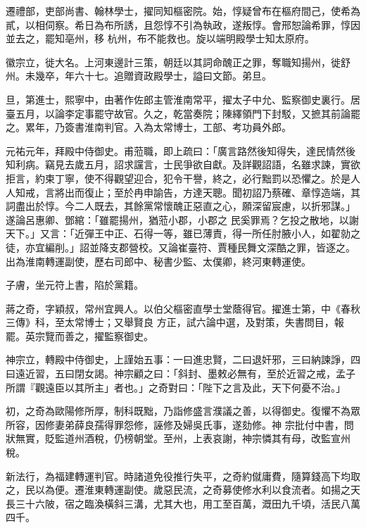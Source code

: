 \begin{pinyinscope}
 遷禮部，吏部尚書、翰林學士，擢同知樞密院。始，惇疑曾布在樞府間己，使希為貳，以相伺察。希日為布所誘，且怨惇不引為執政，遂叛惇。會邢恕論希罪，惇因並去之，罷知亳州，移
 杭州，布不能救也。旋以端明殿學士知太原府。



 徽宗立，徙大名。上河東邊計三策，朝廷以其詞命醜正之罪，奪職知揚州，徙舒州。未幾卒，年六十七。追贈資政殿學士，謚曰文節。弟旦。



 旦，第進士，熙寧中，由著作佐郎主管淮南常平，擢太子中允、監察御史裏行。居臺五月，以論李定事罷守故官。久之，乾當奏院；陳繹領門下封駁，又摭其前論罷之。累年，乃簽書淮南判官。入為太常博士，工部、考功員外郎。



 元祐元年，拜殿中侍御史。甫蒞職，即上疏曰：「廣言路然後知得失，達民情然後知利病。竊見去歲五月，詔求讜言，士民爭欲自獻。及詳觀詔語，名雖求諫，實欲拒言，約束丁寧，使不得觀望迎合，犯令干譽，終之，必行黜罰以恐懼之。於是人人知戒，言將出而復止；至於冉申諭告，方達天聰。聞初詔乃蔡確、章惇造端，其詞盡出於惇。今二人既去，其餘黨常懷醜正惡直之心，願深留宸慮，以折邪謀。」遂論呂惠卿、鄧綰：「雖罷揚州，猶蒞小郡，小郡之
 民奚罪焉？乞投之散地，以謝天下。」又言：「近彈王中正、石得一等，雖已薄責，得一所任肘腋小人，如翟勍之徒，亦宜編削。」詔並降支郡營校。又論崔臺符、賈種民舞文深酷之罪，皆逐之。出為淮南轉運副使，歷右司郎中、秘書少監、太僕卿，終河東轉運使。



 子膚，坐元符上書，陷於黨籍。



 蔣之奇，字穎叔，常州宜興人。以伯父樞密直學士堂蔭得官。擢進士第，中《春秋三傳》科，至太常博士；又舉賢良
 方正，試六論中選，及對策，失書問目，報罷。英宗覽而善之，擢監察御史。



 神宗立，轉殿中侍御史，上謹始五事：一曰進忠賢，二曰退奸邪，三曰納諫諍，四曰遠近習，五曰閉女謁。神宗顧之曰：「斜封、墨敕必無有，至於近習之戒，孟子所謂『觀遠臣以其所主」者也。」之奇對曰：「陛下之言及此，天下何憂不治。」



 初，之奇為歐陽修所厚，制科既黜，乃詣修盛言濮議之善，以得御史。復懼不為眾所容，因修妻弟薛良孺得罪怨修，誣修及婦吳氏事，遂劾修。神
 宗批付中書，問狀無實，貶監道州酒稅，仍榜朝堂。至州，上表哀謝，神宗憐其有母，改監宣州稅。



 新法行，為福建轉運判官。時諸道免役推行失平，之奇約僦庸費，隨算錢高下均取之，民以為便。遷淮東轉運副使。歲惡民流，之奇募使修水利以食流者。如揚之天長三十六陂，宿之臨渙橫斜三溝，尤其大也，用工至百萬，溉田九千頃，活民八萬四千。




\end{pinyinscope}
